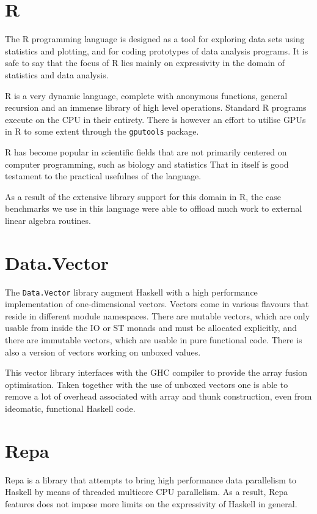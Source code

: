 \section{R}

The R programming language is designed as a tool for exploring data sets using
statistics and plotting, and for coding prototypes of data analysis programs.
It is safe to say that the focus of R lies mainly on expressivity in the domain
of statistics and data analysis.

R is a very dynamic language, complete with anonymous functions, general
recursion and an immense library of high level operations. Standard R programs
execute on the CPU in their entirety. There is however an effort to utilise
GPUs in R to some extent through the \texttt{gputools}
package\cite{crangputools}.

R has become popular in scientific fields that are not primarily centered on
computer programming, such as biology and statistics
That in itself is good testament to the practical usefulnes of the language.

As a result of the extensive library support for this domain in R, the case
benchmarks we use in this language were able to offload much work to external
linear algebra routines.

\section{Data.Vector}

The \texttt{Data.Vector} library augment Haskell with a high performance
implementation of one-dimensional vectors. Vectors come in various flavours
that reside in different module namespaces. There are mutable vectors, which
are only usable from inside the IO or ST monads and must be allocated
explicitly, and there are immutable vectors, which are usable in pure
functional code. There is also a version of vectors working on unboxed values.

This vector library interfaces with the GHC compiler to provide the array
fusion optimisation. Taken together with the use of unboxed vectors one is able
to remove a lot of overhead associated with array and thunk construction, even
from ideomatic, functional Haskell code.

\section{Repa}

Repa is a library that attempts to bring high performance data parallelism to
Haskell by means of threaded multicore CPU parallelism. As a result, Repa
features does not impose more limits on the expressivity of Haskell in general.

